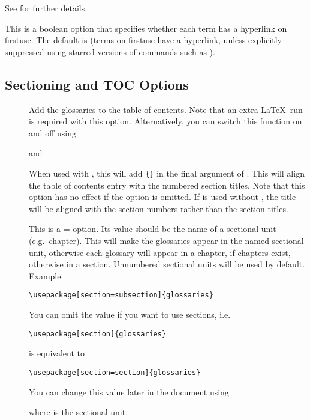 \documentclass{nlctdoc}
\newcommand*{\firstuse}{\gls{firstuse}}
\begin{document}
\begin{description}
See  for further details.

\item[\pkgopt{hyperfirst}] This is a boolean option that specifies
whether each term has a hyperlink on \firstuse. The default is 
 (terms on \gls{firstuse} have a hyperlink, 
unless explicitly suppressed using starred versions of commands
such as ).

\end{description}

\subsection{Sectioning and TOC Options}
\label{sec:pkgopts-sec}

\begin{description}
\item[] Add the glossaries to the table of contents.
Note that an extra \LaTeX\ run is required with this option.
Alternatively, you can switch this function on and off using
\begin{definition}[\DescribeMacro{\glstoctrue}]
\end{definition}
and
\begin{definition}[\DescribeMacro{\glstocfalse}]
\end{definition}

\item[] When used with , this will
add \verb|{}| in the final argument of 
. This will align the table of contents entry 
with the numbered section titles. Note that this option has no
effect if the  option is omitted. If  is
used without , the title will be aligned with
the section numbers rather than the section titles.

\item[] This is a = option.  Its
value should be the name of a sectional unit (e.g.\ chapter).
This will make the glossaries appear in the named sectional unit,
otherwise each glossary will appear in a chapter, if chapters
exist, otherwise in a section. Unnumbered sectional units will be used
by default. Example:
\begin{verbatim}
\usepackage[section=subsection]{glossaries}
\end{verbatim}
You can omit the value if you want to use sections, i.e.\
\begin{verbatim}
\usepackage[section]{glossaries}
\end{verbatim}
is equivalent to
\begin{verbatim}
\usepackage[section=section]{glossaries}
\end{verbatim}
You can change this value later in the document using
\begin{definition}[\DescribeMacro{\setglossarysection}]
\end{definition}
where  is the sectional unit.


\end{description}
\end{document}
